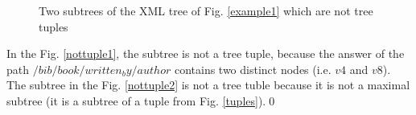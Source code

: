 \begin{example}
\begin{figure}[h]
    \centering
	\caption{Two subtrees of the XML tree of Fig. \ref{example1} which are not tree tuples}
    \label{nottuples}
\end{figure}

In the Fig. \ref{nottuple1}, the subtree is not a tree tuple, because the answer of the path $/bib/book/written_by/author$ contains two distinct nodes (i.e. $v4$ and $v8$). The subtree in the Fig. \ref{nottuple2} is not a tree tuble because it is not a maximal subtree (it is a subtree of a tuple from Fig. \ref{tuples}).\qed

\end{example}

